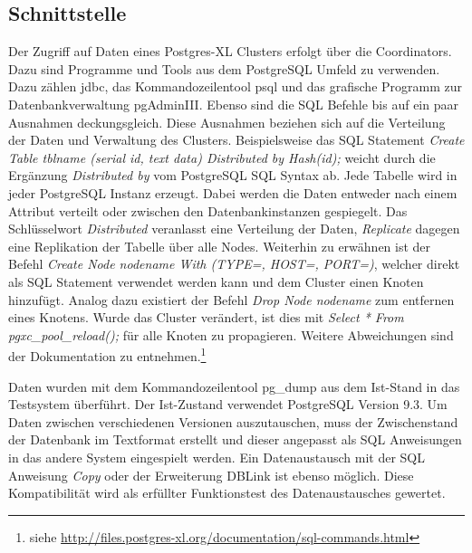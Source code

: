 \subsection{Schnittstelle}
\label{subsection:interface}
Der Zugriff auf Daten eines Postgres-XL Clusters erfolgt über die Coordinators.
Dazu sind Programme und Tools aus dem PostgreSQL Umfeld zu verwenden.
Dazu zählen \Gls{jdbc}, das Kommandozeilentool psql und das grafische Programm zur Datenbankverwaltung pgAdminIII.
Ebenso sind die SQL Befehle bis auf ein paar Ausnahmen deckungsgleich.
Diese Ausnahmen beziehen sich auf die Verteilung der Daten und Verwaltung des Clusters.
Beispielsweise das SQL Statement \textit{Create Table tblname (serial id, text data) Distributed by Hash(id);} weicht durch die Ergänzung \textit{Distributed by} vom PostgreSQL SQL Syntax ab.
Jede Tabelle wird in jeder PostgreSQL Instanz erzeugt.
Dabei werden die Daten entweder nach einem Attribut verteilt oder zwischen den Datenbankinstanzen gespiegelt.
Das Schlüsselwort \textit{Distributed} veranlasst eine Verteilung der Daten, \textit{Replicate} dagegen eine Replikation der Tabelle über alle Nodes.
Weiterhin zu erwähnen ist der Befehl \textit{Create Node nodename With (TYPE=, HOST=, PORT=)}, welcher direkt als SQL Statement verwendet werden kann und dem Cluster einen Knoten hinzufügt.
Analog dazu existiert der Befehl \textit{Drop Node nodename} zum entfernen eines Knotens.
Wurde das Cluster verändert, ist dies mit \textit{Select * From pgxc\_{}pool\_{}reload();} für alle Knoten zu propagieren.
Weitere Abweichungen sind der Dokumentation zu entnehmen.\footnote{siehe \url{http://files.postgres-xl.org/documentation/sql-commands.html}}

Daten wurden mit dem Kommandozeilentool pg\_{}dump aus dem Ist-Stand in das Testsystem überführt.
Der Ist-Zustand verwendet PostgreSQL Version 9.3.
Um Daten zwischen verschiedenen Versionen auszutauschen, muss der Zwischenstand der Datenbank im Textformat erstellt und dieser angepasst als SQL Anweisungen in das andere System eingespielt werden.
Ein Datenaustausch mit der SQL Anweisung \textit{Copy} oder der Erweiterung DBLink ist ebenso möglich.
Diese Kompatibilität wird als erfüllter Funktionstest des Datenaustausches gewertet.



